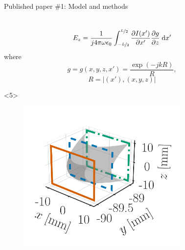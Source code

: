 \documentclass[xcolor=dvipsnames,10pt]{beamer}
\begin{document}
\begin{frame}{Published paper \#1: Model and methods}
\begin{onlyenv}
\begin{columns}[c]
\begin{column}{0.4\textwidth}
\begin{onlyenv}
\begin{footnotesize}
\begin{equation*}
                        \end{equation*}
                        \begin{equation*}
                            E_z = \frac{1}{j4\pi\omega\epsilon_0} \int_{-\nicefrac{L}{2}}^{\nicefrac{L}{2}} \frac{\partial I(x')}{\partial x'} \frac{\partial g}{\partial z} \; \mathrm{d}x'
                        \end{equation*}
                        where
                        \begin{equation*}
                            g = g(x, y, z, x') = \frac{\exp{(-jkR)}}{R},
                        \end{equation*}
                        \begin{equation*}
                            R = \lvert (x'), (x, y, z) \rvert
                        \end{equation*}
                    \end{footnotesize}
                \end{onlyenv}
                \begin{onlyenv}<5>
                    \begin{center}
                    \begin{figure}
                        \includegraphics[width=0.8\textwidth]{artwork/IEEE-TEMC-tissue.pdf}
                    \end{figure}
                    \end{center}
                \end{onlyenv}
            \end{column} 
            \begin{column}{0.6\textwidth}

\end{column}
\end{columns}
\end{onlyenv}
\end{frame}
\end{document}
